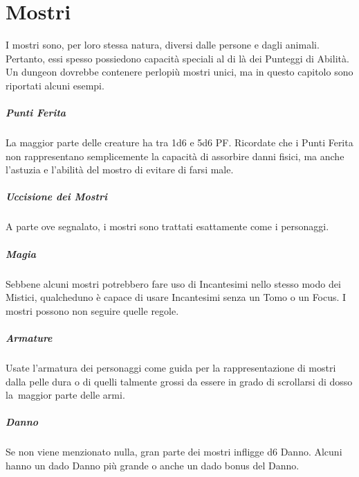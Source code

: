 \documentclass[itdr]{subfiles}
\begin{document}
\cleartoleftpage

\chapter{Mostri}
\label{ch:mostri}

I mostri sono, per loro stessa natura, diversi dalle persone e dagli animali. Pertanto, essi spesso possiedono capacità speciali al di là dei Punteggi di Abilità. Un dungeon dovrebbe contenere perlopiù mostri unici, ma in questo capitolo sono riportati alcuni esempi.

\vfill
{}
\paragraph{Punti Ferita}
La maggior parte delle creature ha tra 1d6 e 5d6 PF. Ricordate che i Punti Ferita non rappresentano semplicemente la capacità di assorbire danni fisici, ma anche l'astuzia e l'abilità del mostro di evitare di farsi male.

\vfill
\paragraph{Uccisione dei Mostri}
A parte ove segnalato, i mostri sono trattati esattamente come i personaggi.

\vfill
{}
\paragraph{Magia}
Sebbene alcuni mostri potrebbero fare uso di Incantesimi nello stesso modo dei Mistici, qualcheduno è capace di usare Incantesimi senza un Tomo o un Focus. I mostri possono non seguire quelle regole.

\vfill
{}
\paragraph{Armature}
Usate l'armatura dei personaggi come guida per la rappresentazione di mostri dalla pelle dura o di quelli talmente grossi da essere in grado di scrollarsi di dosso la~maggior parte delle armi.

\vfill
{}
\paragraph{Danno}
Se non viene menzionato nulla, gran parte dei mostri infligge d6 Danno. Alcuni hanno un dado Danno più grande o anche un dado bonus del Danno.
\end{document}
